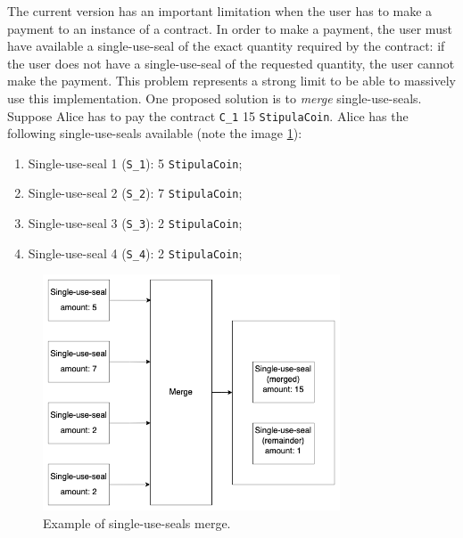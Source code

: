 The current version has an important limitation when the user has to make a payment to an instance of a 
contract. In order to make a payment, the user must have available a single-use-seal of the exact quantity 
required by the contract: if the user does not have a single-use-seal of the requested quantity, the user 
cannot make the payment. This problem represents a strong limit to be able to massively use this 
implementation. One proposed solution is to \textit{merge} single-use-seals. Suppose Alice has to pay the 
contract \verb|C_1| 15 \verb|StipulaCoin|. Alice has the following single-use-seals available (note the 
image \ref{fig:single-use-seals-merge}):
\begin{enumerate}
  \item Single-use-seal 1 (\verb|S_1|): 5 \verb|StipulaCoin|;
  \item Single-use-seal 2 (\verb|S_2|): 7 \verb|StipulaCoin|;
  \item Single-use-seal 3 (\verb|S_3|): 2 \verb|StipulaCoin|;
  \item Single-use-seal 4 (\verb|S_4|): 2 \verb|StipulaCoin|;
\end{enumerate}

\begin{figure}[htbp]
	\begin{center}
		\includegraphics[height=7cm]{immagini/capitolo-6/single-use-seals-merge.png}
		\caption{Example of single-use-seals merge.}
		\label{fig:single-use-seals-merge}
	\end{center}
\end{figure}

